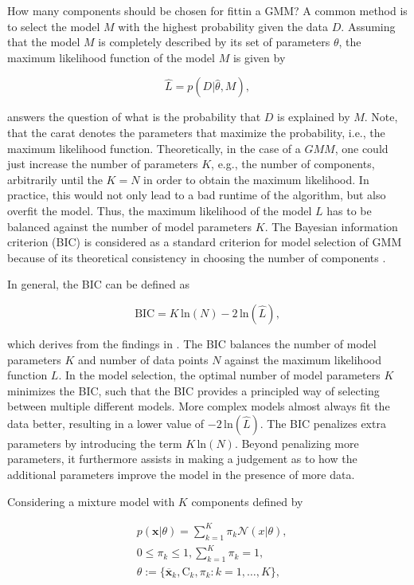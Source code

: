 How many components should be chosen for fittin a GMM? A common method is to select the model $M$ with the highest probability given the data $D$. Assuming that the model $M$ is completely described by its set of parameters $\theta$, the maximum likelihood function of the model $M$ is given by 

\begin{equation}
    \hat{L} = p(D|\hat{\theta}, M),
\end{equation}
    
answers the question of what is the probability that $D$ is explained by $M$. Note, that the carat denotes the parameters that maximize the probability, i.e., the maximum likelihood function. Theoretically, in the case of a $GMM$, one could just increase the number of parameters $K$, e.g., the number of components, arbitrarily until the $K = N$ in order to obtain the maximum likelihood. In practice, this would not only lead to a bad runtime of the algorithm, but also overfit the model. Thus, the maximum likelihood of the model $L$ has to be balanced against the number of model parameters $K$. The Bayesian information criterion (BIC) is considered as a standard criterion for model selection of GMM because of its theoretical consistency in choosing the number of components \cite{keribin2000consistent}.

In general, the BIC can be defined as

\begin{equation}
    \text{BIC} = K \, \text{ln}(N) - 2 \, \text{ln}(\hat{L}),
\end{equation}

which derives from the findings in \cite{schwarz1978estimating}. The BIC balances the number of model parameters $K$ and number of data points $N$ against the maximum likelihood function $L$. In the model selection, the optimal number of model parameters $K$ minimizes the BIC, such that the BIC provides a principled way of selecting between multiple different models. More complex models almost always fit the data better, resulting in a lower value of $-2 \, \text{ln}(\hat{L})$. The BIC penalizes extra parameters by introducing the term $K \, \text{ln}(N)$. Beyond penalizing more parameters, it furthermore assists in making a judgement as to how the additional parameters improve the model in the presence of more data.

Considering a mixture model with $K$ components defined by 

\begin{equation}
    \begin{aligned}
        &p(\bm{x}|\theta) = \sum\limits_{k=1}^K \pi_k \mathcal{N}(x | \theta), \\
        &0 \leq \pi_k \leq 1, \sum\limits_{k=1}^K \pi_k = 1, \\
        &\theta := \{\overline{\bm{x}}_k, \bm{\mathrm{C}}_k, \pi_k : k = 1, \dots, K \},
    \end{aligned}
\end{equation}

